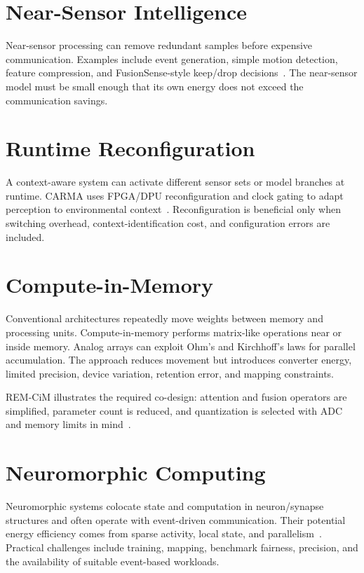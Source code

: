 \section{Near-Sensor Intelligence}

Near-sensor processing can remove redundant samples before expensive communication. Examples include event generation, simple motion detection, feature compression, and FusionSense-style keep/drop decisions~\cite{yun2026fusionsense}. The near-sensor model must be small enough that its own energy does not exceed the communication savings.

\section{Runtime Reconfiguration}

A context-aware system can activate different sensor sets or model branches at runtime. CARMA uses FPGA/DPU reconfiguration and clock gating to adapt perception to environmental context~\cite{zhang2023carma}. Reconfiguration is beneficial only when switching overhead, context-identification cost, and configuration errors are included.

\section{Compute-in-Memory}

Conventional architectures repeatedly move weights between memory and processing units. Compute-in-memory performs matrix-like operations near or inside memory. Analog arrays can exploit Ohm's and Kirchhoff's laws for parallel accumulation. The approach reduces movement but introduces converter energy, limited precision, device variation, retention error, and mapping constraints.

REM-CiM illustrates the required co-design: attention and fusion operators are simplified, parameter count is reduced, and quantization is selected with ADC and memory limits in mind~\cite{ichikawa2024remcim}.

\section{Neuromorphic Computing}

Neuromorphic systems colocate state and computation in neuron/synapse structures and often operate with event-driven communication. Their potential energy efficiency comes from sparse activity, local state, and parallelism~\cite{roy2019towards,schuman2022opportunities}. Practical challenges include training, mapping, benchmark fairness, precision, and the availability of suitable event-based workloads.

